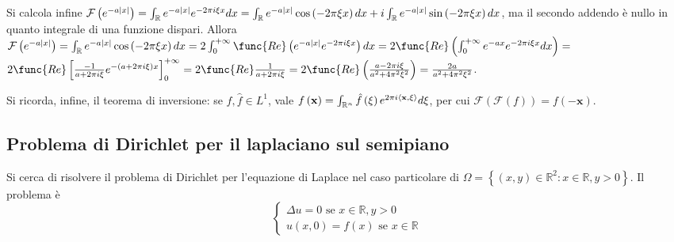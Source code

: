 \documentclass{article}
\begin{document}
Si calcola infine $\mathcal{F}\left( e^{-a\left\vert x\right\vert }\right)
=\int_{%
\mathbb{R}
}e^{-a\left\vert x\right\vert }e^{-2\pi i\xi x}dx=\int_{%
\mathbb{R}
}e^{-a\left\vert x\right\vert }\cos \left( -2\pi \xi x\right) dx+i\int_{%
\mathbb{R}
}e^{-a\left\vert x\right\vert }\sin \left( -2\pi \xi x\right) dx$, ma il
secondo addendo \`{e} nullo in quanto integrale di una funzione dispari.
Allora $\mathcal{F}\left( e^{-a\left\vert x\right\vert }\right) =\int_{%
\mathbb{R}
}e^{-a\left\vert x\right\vert }\cos \left( -2\pi \xi x\right)
dx=2\int_{0}^{+\infty }\func{Re}\left( e^{-a\left\vert x\right\vert
}e^{-2\pi i\xi x}\right) dx=2\func{Re}\left( \int_{0}^{+\infty
}e^{-ax}e^{-2\pi i\xi x}dx\right) =$ $2\func{Re}\left[ \frac{-1}{a+2\pi i\xi 
}e^{-\left( a+2\pi i\xi \right) x}\right] _{0}^{+\infty }=2\func{Re}\frac{1}{%
a+2\pi i\xi }=2\func{Re}\left( \frac{a-2\pi i\xi }{a^{2}+4\pi ^{2}\xi ^{2}}%
\right) =\frac{2a}{a^{2}+4\pi ^{2}\xi ^{2}}$.

Si ricorda, infine, il teorema di inversione: se $f,\hat{f}\in L^{1}$, vale $%
f\left( \mathbf{x}\right) =\int_{%
\mathbb{R}
^{n}}\hat{f}\left( \mathbf{\xi }\right) e^{2\pi i\left\langle \mathbf{x,\xi }%
\right\rangle }d\mathbf{\xi }$, per cui $\mathcal{F}\left( \mathcal{F}\left(
f\right) \right) =f\left( -\mathbf{x}\right) $.

\subsection{Problema di Dirichlet per il laplaciano sul semipiano}

Si cerca di risolvere il problema di Dirichlet per l'equazione di Laplace
nel caso particolare di $\Omega =\left\{ \left( x,y\right) \in 
\mathbb{R}
^{2}:x\in 
\mathbb{R}
,y>0\right\} $. Il problema \`{e} 
\begin{equation*}
\left\{ 
\begin{array}{c}
\Delta u=0\text{ se }x\in 
\mathbb{R}
,y>0 \\ 
u\left( x,0\right) =f\left( x\right) \text{ se }x\in 
\mathbb{R}%
\end{array}%
\right.
\end{equation*}
\end{document}
